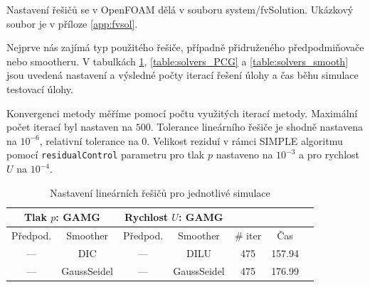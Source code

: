 \documentclass[a4paper,12pt]{report}
\theoremstyle{remark}
\begin{document}
Nastavení řešičů se v OpenFOAM dělá v souboru system/fvSolution. Ukázkový soubor je v příloze \ref{app:fvsol}.
	
 Nejprve nás zajímá typ použitého řešiče, případně přidruženého předpodmiňovače nebo smootheru. V tabulkách \ref{table:solvers_GAMG}, \ref{table:solvers_PCG} a \ref{table:solvers_smooth} jsou uvedená nastavení a výsledné počty iterací řešení úlohy a čas běhu simulace testovací úlohy.
 
 Konvergenci metody měříme pomocí počtu využitých iterací metody. Maximální počet iterací byl nastaven na $500$. Tolerance lineárního řešiče je shodně nastavena na $10^{-6}$, relativní tolerance na $0$. Velikost reziduí v rámci SIMPLE algoritmu pomocí \texttt{residualControl} parametru pro tlak $p$ nastaveno na $10^{-3}$ a pro rychlost $U$ na $10^{-4}$.

 \begin{table}[H]
	\centering
	\caption{Nastavení lineárních řešičů pro jednotlivé simulace}
	\renewcommand{\arraystretch}{1.9}
	\begin{tabular}{*7c}
		\toprule
		\multicolumn{2}{c}{Tlak $p$: \textbf{GAMG}} & \multicolumn{2}{c}{Rychlost $U$: \textbf{GAMG}}\\		
		\midrule
		Předpod.&Smoother&Předpod.&Smoother&\# iter&Čas\\
		\midrule
 --- & DIC & --- &  DILU & 475 &157.94\\		
 --- & GaussSeidel &  --- & GaussSeidel & 475&176.99\\
		
			\bottomrule
\end{tabular}

\label{table:solvers_GAMG}

\end{table}
\end{document}

